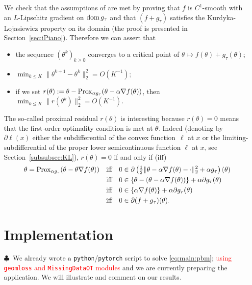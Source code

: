 We check that the assumptions  of \cite[Theorems~4.9 and 4.14]{iPiano} are met
by  proving that  $f$  is  $C^{1}$-smooth with  an  $L$-Lipschitz gradient  on
$\operatorname{dom}  g_{\tau}$ and  that  $(f+g_{\tau})$  satisfies the  Kurdyka-Lojasiewicz
property on its  domain (the proof is  presented in Section~\ref{sec:iPiano}).
Therefore we can assert that
\begin{itemize}
\item the sequence $(\theta^{k})_{k \geq 0}$  converges to a critical point of
  $\theta \mapsto f(\theta) + g_{\tau}(\theta)$;
\item $\min_{k \leq K} \|\theta^{k+1} - \theta^{k}\|_{2}^{2} = O(K^{-1})$;
\item                      if                      we                      set
  $r(\theta)  :=  \theta  -  \operatorname{Prox}_{\alpha g_{\tau}}  (\theta  -  \alpha\nabla
  f(\theta))$, then $\min_{k \leq K} \|r(\theta^{k})\|_{2}^{2} = O(K^{-1})$.
\end{itemize}
The   so-called  proximal   residual   $r(\theta)$   is  interesting   because
$r(\theta) =  0$ means  that the  first-order optimality  condition is  met at
$\theta$.  Indeed (denoting by $\partial  \ell (x)$ either the subdifferential
of the  convex function~$\ell$ at  $x$ or the limiting-subdifferential  of the
proper    lower     semicontinuous    function    $\ell$    at     $x$,    see
Section~\ref{subsubsec:KL}), $r(\theta) = 0$ if and only if (iff)
\begin{align*}
  \theta = \operatorname{Prox}_{\alpha g_{\tau}} (\theta - \theta \nabla f(\theta))
  & \quad\text{iff}\quad  0 \in \partial \left(\tfrac{1}{2} \|\theta - \alpha \nabla
    f(\theta)       -      \cdot\|_{2}^{2}       +      \alpha
    g_{\tau}\right)(\theta) \\
  & \quad\text{iff}\quad 0 \in \{\theta - (\theta - \alpha \nabla f(\theta))\} +
    \alpha \partial g_{\tau}(\theta)\\
  & \quad\text{iff}\quad 0  \in \{\alpha \nabla f(\theta)\}  + \alpha \partial
    g_{\tau}(\theta) \\
  & \quad\text{iff}\quad 0 \in \partial(f + g_{\tau})(\theta).
\end{align*}

\section{Implementation}
\label{sec:implementation}

$\clubsuit$~We  already  wrote  a \texttt{python}/\texttt{pytorch}  script  to
solve \eqref{eq:main:pbm}; \textcolor{red}{using \texttt{geomloss} and \texttt{MissingDataOT} modules}  and we are  currently preparing the application.  We
will illustrate and comment on our results.

